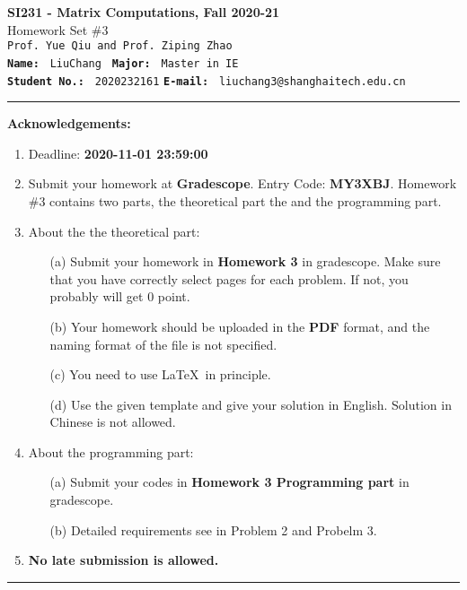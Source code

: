 \documentclass[english,onecolumn]{IEEEtran}
\begin{document}
\begin{center}
	\textbf{\LARGE{SI231 - Matrix Computations, Fall 2020-21}}\\
	{\Large Homework Set \#3}\\
	\texttt{Prof. Yue Qiu and Prof. Ziping Zhao}\\
	\texttt{\textbf{Name:}}   	\texttt{ LiuChang }  		\hspace{1bp}
	\texttt{\textbf{Major:}}  	\texttt{ Master in IE } 	\\
	\texttt{\textbf{Student No.:}} 	\texttt{ 2020232161}     \hspace{1bp}
	\texttt{\textbf{E-mail:}} 	\texttt{ liuchang3@shanghaitech.edu.cn}
\par\end{center}



\noindent
\rule{\linewidth}{0.4pt}
{\bf {\large Acknowledgements:}}
\begin{enumerate}
    \item Deadline: \textbf{2020-11-01 23:59:00}
    \item Submit your homework at \textbf{Gradescope}. Entry Code: \textbf{MY3XBJ}. 
    Homework \#3 contains two parts, the theoretical part the and the programming part.
    \item About the the theoretical part:
    \begin{enumerate}
            \item[(a)] Submit your homework in \textbf{Homework 3} in gradescope. Make sure that you have correctly select pages for each problem. If not, you probably will get 0 point.
            \item[(b)] Your homework should be uploaded in the \textbf{PDF} format, and the naming format of the file is not specified.
            \item[(c)] You need to use \LaTeX $\,$ in principle.
            \item[(d)] Use the given template and give your solution in English. Solution in Chinese is not allowed. 
        \end{enumerate}
  \item About the programming part:
  \begin{enumerate}
      \item[(a)] Submit your codes in \textbf{Homework 3 Programming part} in gradescope.
      \item[(b)] Detailed requirements see in Problem 2 and Probelm 3.
  \end{enumerate}
  \item \textbf{No late submission is allowed.}
\end{enumerate}
\rule{\linewidth}{0.4pt}
\newpage 
\end{document}
